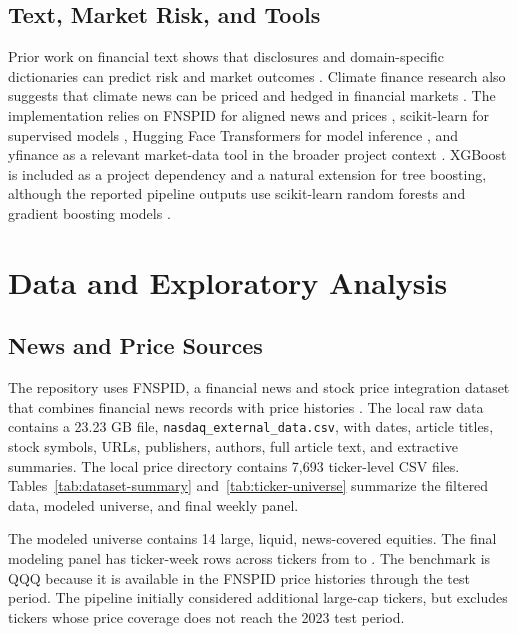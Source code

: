\documentclass[sigconf,nonacm]{acmart}
\begin{document}
\subsection{Text, Market Risk, and Tools}
Prior work on financial text shows that disclosures and domain-specific dictionaries can predict risk and market outcomes \cite{kogan2009risk,loughran2011liability}. Climate finance research also suggests that climate news can be priced and hedged in financial markets \cite{engle2020hedging}. The implementation relies on FNSPID for aligned news and prices \cite{dong2024fnspid}, scikit-learn for supervised models \cite{pedregosa2011scikit}, Hugging Face Transformers for model inference \cite{wolf2020transformers}, and yfinance as a relevant market-data tool in the broader project context \cite{aroussi2024yfinance}. XGBoost is included as a project dependency and a natural extension for tree boosting, although the reported pipeline outputs use scikit-learn random forests and gradient boosting models \cite{chen2016xgboost}.

\section{Data and Exploratory Analysis}
\subsection{News and Price Sources}
The repository uses FNSPID, a financial news and stock price integration dataset that combines financial news records with price histories \cite{dong2024fnspid}. The local raw data contains a 23.23 GB file, \texttt{nasdaq\_external\_data.csv}, with dates, article titles, stock symbols, URLs, publishers, authors, full article text, and extractive summaries. The local price directory contains 7,693 ticker-level CSV files. Tables~\ref{tab:dataset-summary} and~\ref{tab:ticker-universe} summarize the filtered data, modeled universe, and final weekly panel.




The modeled universe contains 14 large, liquid, news-covered equities. The final modeling panel has \PanelRows{} ticker-week rows across \PanelTickers{} tickers from \PanelStart{} to \PanelEnd{}. The benchmark is QQQ because it is available in the FNSPID price histories through the test period. The pipeline initially considered additional large-cap tickers, but excludes tickers whose price coverage does not reach the 2023 test period.
\end{document}
